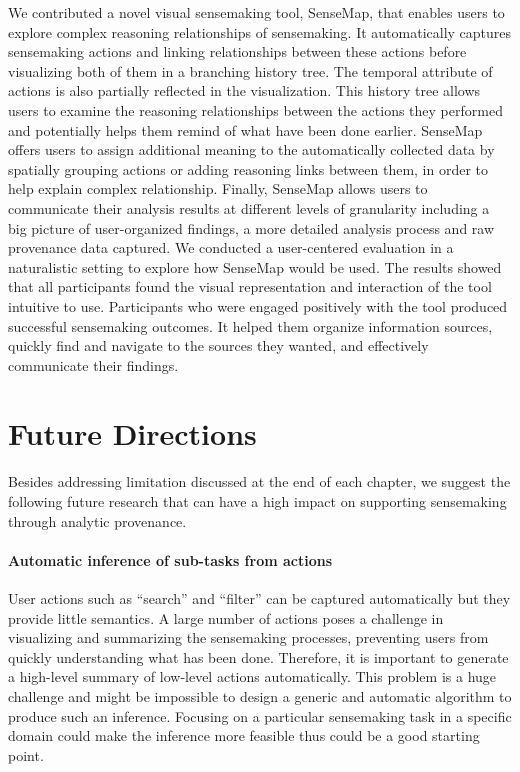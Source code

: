 We contributed a novel visual sensemaking tool, SenseMap, that enables users to explore complex reasoning relationships of sensemaking. It automatically captures sensemaking actions and linking relationships between these actions before visualizing both of them in a branching history tree. The temporal attribute of actions is also partially reflected in the visualization. This history tree allows users to examine the reasoning relationships between the actions they performed and potentially helps them remind of what have been done earlier. SenseMap offers users to assign additional meaning to the automatically collected data by spatially grouping actions or adding reasoning links between them, in order to help explain complex relationship. Finally, SenseMap allows users to communicate their analysis results at different levels of granularity including a big picture of user-organized findings, a more detailed analysis process and raw provenance data captured. We conducted a user-centered evaluation in a naturalistic setting to explore how SenseMap would be used. The results showed that all participants found the visual representation and interaction of the tool intuitive to use. Participants who were engaged positively with the tool produced successful sensemaking outcomes. It helped them organize information sources, quickly find and navigate to the sources they wanted, and effectively communicate their findings.

\section{Future Directions}
Besides addressing limitation discussed at the end of each chapter, we suggest the following future research that can have a high impact on supporting sensemaking through analytic provenance.

\paragraph{Automatic inference of sub-tasks from actions}
User actions such as ``search'' and ``filter'' can be captured automatically but they provide little semantics. A large number of actions poses a challenge in visualizing and summarizing the sensemaking processes, preventing users from quickly understanding what has been done. Therefore, it is important to generate a high-level summary of low-level actions automatically. This problem is a huge challenge and might be impossible to design a generic and automatic algorithm to produce such an inference. Focusing on a particular sensemaking task in a specific domain could make the inference more feasible thus could be a good starting point.

